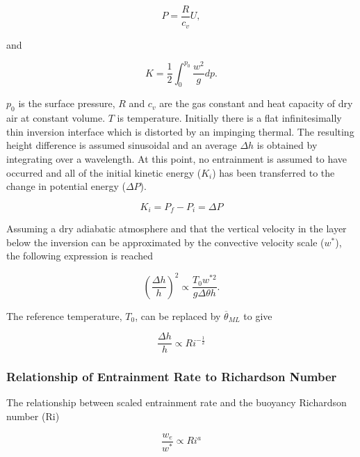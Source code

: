 \begin{equation}
P = \frac{R}{c_{v}}U,
\end{equation}

and

\begin{equation}
K = \frac{1}{2} \int^{p_{0}}_{0}\frac{w^{2}}{g}dp.
\end{equation}

$p_{0}$ is the surface pressure, $R$ and $c_{v}$ are the gas constant and heat capacity of dry air at constant volume.
$T$ is temperature.  Initially there is a flat infinitesimally thin inversion interface  which is distorted by an
impinging thermal.  The resulting height difference is assumed sinusoidal and an average $\Delta h$ is obtained by integrating 
over a wavelength.  At this point, no entrainment is assumed to have occurred and all of the initial kinetic energy ($K_{i}$) has been transferred to the change in potential energy ($\Delta P$).

\begin{equation}
K_{i} = P_{f} - P_{i} = \Delta P
\end{equation}

Assuming a dry adiabatic atmosphere and that the vertical velocity in the layer below the inversion can be approximated by the convective velocity scale ($w^{*}$), the following expression is reached

\begin{equation}
\left(\frac{\Delta h}{h}\right)^{2} \propto \frac{T_{0} w^{*2}}{g \Delta \theta h}.
\end{equation}

The reference temperature, $T_{0}$, can be replaced by $\overline{\theta}_{ML}$ to give

\begin{equation}
\frac{\Delta h}{h} \propto Ri^{-\frac{1}{2}}
\end{equation}
\subsubsection{Relationship of Entrainment Rate to Richardson Number}
\label{subsec:erri}
The relationship between scaled entrainment rate and the buoyancy Richardson number (\acs{Ri})

\begin{equation}\label{eq:ervsri}
\frac{w_{e}}{w^{*}} \propto Ri^{a}
\end{equation}

